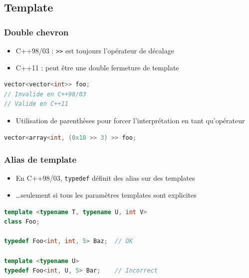\documentclass[C++.tex]{subfiles}
\begin{document}
\subsection*{Template}
\begin{frame}[fragile]
	\frametitle{Double chevron}
	\begin{itemize}
		\item C++98/03 : \lstinline|>>| est toujours l'opérateur de décalage
		\item C++11 : peut être une double fermeture de template
	\end{itemize}

	\begin{lstlisting}[language=C++]
vector<vector<int>> foo;
// Invalide en C++98/03
// Valide en C++11\end{lstlisting}


	\begin{itemize}
		\item Utilisation de parenthèses pour forcer l'interprétation en tant qu'opérateur
	\end{itemize}

	\begin{lstlisting}[language=C++]
vector<array<int, (0x10 >> 3) >> foo;\end{lstlisting}
\end{frame}

\begin{frame}[fragile]
	\frametitle{Alias de template}
	\begin{itemize}
		\item En C++98/03, \lstinline|typedef| définit des alias sur des templates
		\item \ldots seulement si tous les paramètres templates sont explicites
	\end{itemize}

	\begin{lstlisting}[language=C++]
template <typename T, typename U, int V>
class Foo;

typedef Foo<int, int, 5> Baz;  // OK

template <typename U>
typedef Foo<int, U, 5> Bar;    // Incorrect\end{lstlisting}
\end{frame}
\end{document}
